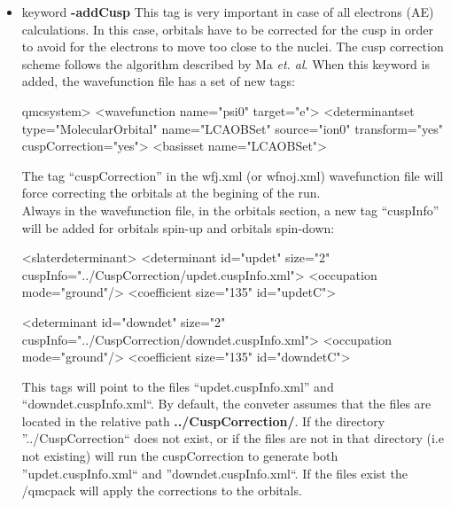 \begin{itemize}
\begin{itemize}
\end{itemize}


\item keyword \textbf{-addCusp}
This tag is very important in case of all electrons (AE) calculations. In this case, orbitals have to be corrected for the cusp in order to avoid for the electrons to move too close to the nuclei. The cusp correction scheme follows the algorithm described by Ma \textit{et. al}. \cite{Ma2005} When this keyword is added, the wavefunction file has a set of new tags:

\begin{shade}
 qmcsystem>
  <wavefunction name="psi0" target="e">
    <determinantset type="MolecularOrbital" name="LCAOBSet" source="ion0" transform="yes" cuspCorrection="yes">
      <basisset name="LCAOBSet">
\end{shade}

The tag ``cuspCorrection'' in the wfj.xml (or wfnoj.xml) wavefunction file will force correcting the orbitals at the begining of the \qmcpack run. \\
Always in the wavefunction file, in the orbitals section, a new tag ``cuspInfo'' will be added for orbitals spin-up and orbitals spin-down:

\begin{shade}
   <slaterdeterminant>
        <determinant id="updet" size="2" cuspInfo="../CuspCorrection/updet.cuspInfo.xml">
          <occupation mode="ground"/>
          <coefficient size="135" id="updetC">
          
  <determinant id="downdet" size="2" cuspInfo="../CuspCorrection/downdet.cuspInfo.xml">
          <occupation mode="ground"/>
          <coefficient size="135" id="downdetC">
\end{shade}

This tags will point to the files ``updet.cuspInfo.xml'' and ``downdet.cuspInfo.xml``. By default, the conveter assumes that the files are located in the relative path \textbf{../CuspCorrection/}. If the directory ''../CuspCorrection`` does not exist, or if the files are not in that directory (i.e not existing) \qmcpack will run the cuspCorrection to generate both ''updet.cuspInfo.xml`` and ''downdet.cuspInfo.xml``. If the files exist the /qmcpack will apply the corrections to the orbitals. \\


\end{itemize}
